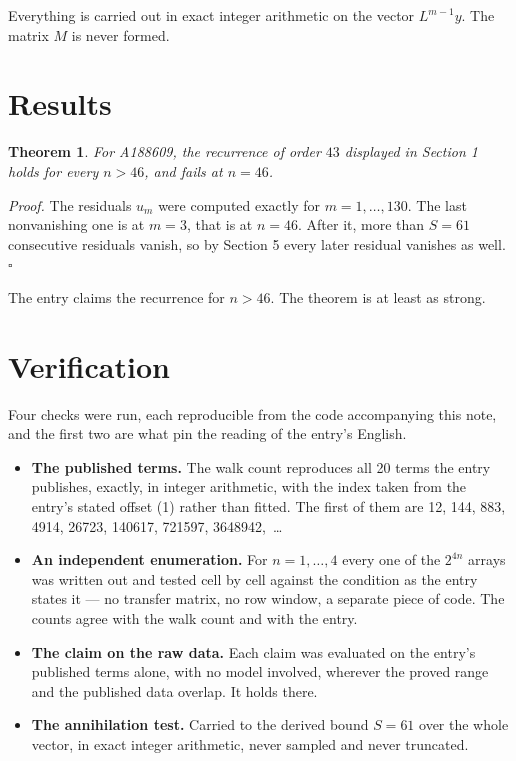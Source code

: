 \documentclass[11pt]{article}
\newtheorem{theorem}{Theorem}
\theoremstyle{definition}
\begin{document}
Everything is carried out in exact integer arithmetic on the vector $L^{m-1}y$. The matrix $M$ is never formed.

\section{Results}

\begin{theorem} For A188609, the recurrence of order $43$ displayed in Section 1 holds for every $n > 46$, and fails at $n = 46$.\end{theorem}

{\itshape Proof.} The residuals $u_m$ were computed exactly for $m = 1,\dots,130$. The last nonvanishing one is at $m = 3$, that is at $n = 46$. After it, more than $S = 61$ consecutive residuals vanish, so by Section 5 every later residual vanishes as well. $\square$

The entry claims the recurrence for $n > 46$. The theorem is at least as strong.

\section{Verification}

Four checks were run, each reproducible from the code accompanying this note, and the first two are what pin the reading of the entry's English.

\begin{itemize}

\item {\bfseries The published terms.} The walk count reproduces all 20 terms the entry publishes, exactly, in integer arithmetic, with the index taken from the entry's stated offset (1) rather than fitted. The first of them are 12, 144, 883, 4914, 26723, 140617, 721597, 3648942,~\dots

\item {\bfseries An independent enumeration.} For $n = 1,\dots,4$ every one of the $2^{4n}$ arrays was written out and tested cell by cell against the condition as the entry states it --- no transfer matrix, no row window, a separate piece of code. The counts agree with the walk count and with the entry.

\item {\bfseries The claim on the raw data.} Each claim was evaluated on the entry's published terms alone, with no model involved, wherever the proved range and the published data overlap. It holds there.

\item {\bfseries The annihilation test.} Carried to the derived bound $S = 61$ over the whole vector, in exact integer arithmetic, never sampled and never truncated.

\end{itemize}
\end{document}
